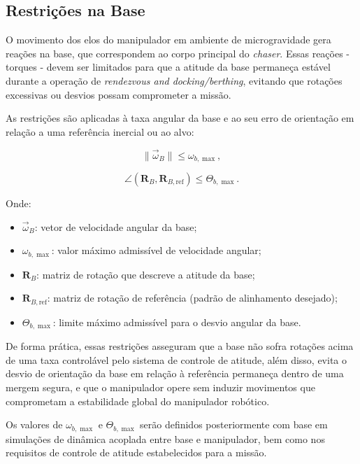 \subsection{Restrições na Base}

O movimento dos elos do manipulador em ambiente de microgravidade gera reações na base, que correspondem ao corpo principal do \emph{chaser}.  
Essas reações - torques - devem ser limitados para que a atitude da base permaneça estável durante a operação de \emph{rendezvous and docking/berthing}, evitando que rotações excessivas ou desvios possam comprometer a missão.

As restrições são aplicadas à taxa angular da base e ao seu erro de orientação em relação a uma referência inercial ou ao alvo:

\begin{equation}
\label{eq:restr_base_w}
\|\vec{\omega}_B\| \leq \omega_{b,\max},
\end{equation}

\begin{equation}
\label{eq:restr_base_theta}
\angle(\mathbf{R}_B, \mathbf{R}_{B,\text{ref}}) \leq \Theta_{b,\max}.
\end{equation}

Onde:
\begin{itemize}
    \item $\vec{\omega}_B$: vetor de velocidade angular da base;
    \item $\omega_{b,\max}$: valor máximo admissível de velocidade angular;
    \item $\mathbf{R}_B$: matriz de rotação que descreve a atitude da base;
    \item $\mathbf{R}_{B,\text{ref}}$: matriz de rotação de referência (padrão de alinhamento desejado);
    \item $\Theta_{b,\max}$: limite máximo admissível para o desvio angular da base.
\end{itemize}

De forma prática, essas restrições asseguram que a base não sofra rotações acima de uma taxa controlável pelo sistema de controle de atitude, além disso, evita o desvio de orientação da base em relação à referência permaneça dentro de uma mergem segura, e que o manipulador opere sem induzir movimentos que comprometam a estabilidade global do manipulador robótico.

Os valores de $\omega_{b,\max}$ e $\Theta_{b,\max}$ serão definidos posteriormente com base em simulações de dinâmica acoplada entre base e manipulador, bem como nos requisitos de controle de atitude estabelecidos para a missão.
